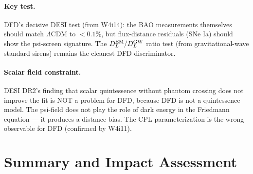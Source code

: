 \documentclass[11pt]{article}
\begin{document}
\paragraph{Key test.}
DFD's decisive DESI test (from W4i14): the BAO measurements themselves
should match $\Lambda$CDM to $<0.1\%$, but flux-distance residuals
(SNe Ia) should show the psi-screen signature. The $D_L^{\rm EM}/D_L^{\rm GW}$
ratio test (from gravitational-wave standard sirens) remains the
cleanest DFD discriminator.

\paragraph{Scalar field constraint.}
DESI DR2's finding that scalar quintessence without phantom crossing does
not improve the fit is NOT a problem for DFD, because DFD is not a
quintessence model. The psi-field does not play the role of dark energy
in the Friedmann equation --- it produces a distance bias. The CPL
parameterization is the wrong observable for DFD (confirmed by W4i11).


\section*{Summary and Impact Assessment}
\end{document}
